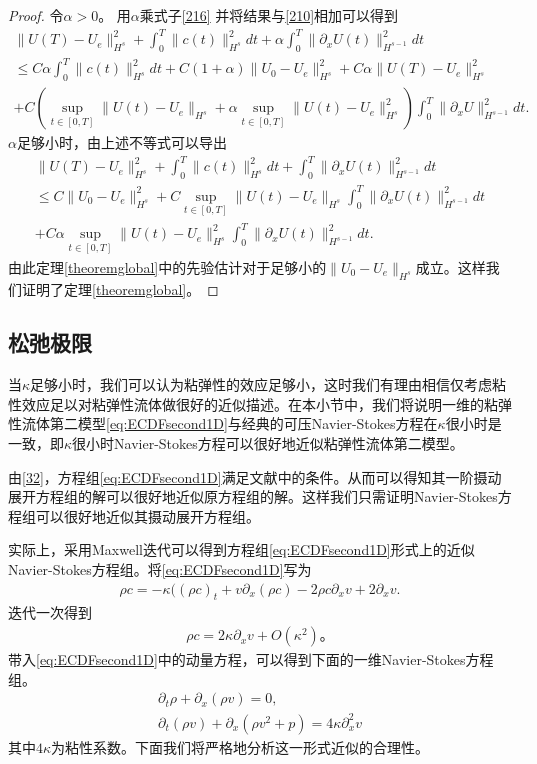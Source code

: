 \begin{proof}
令$\alpha>0$。 用$\alpha$乘式子\eqref{216} 并将结果与\eqref{210}相加可以得到
\begin{eqnarray*}
  \|U(T)-U_e\|_{H^s}^2 + \int_0^T \|c(t)\|_{H^s}^2 dt + \alpha \int_0^T \|\partial_x U(t)\|_{H^{s-1}}^2 dt \\
  \le C \alpha \int_0^T \|c(t)\|_{H^s}^2 dt +C(1+\alpha)\|U_0 -U_e\|_{H^s}^2 + C \alpha \|U(T)-U_e\|_{H^s}^2  \\ + C(\sup_{t \in [0,T]} \|U(t)-U_e\|_{H^s} + \alpha \sup_{t \in [0,T]} \|U(t)-U_e\|_{H^s}^2)  \int_0^T \|\partial_x U\|_{H^{s-1}}^2 dt.
\end{eqnarray*}
$\alpha$足够小时，由上述不等式可以导出
\begin{eqnarray*}
  \|U(T)-U_e\|_{H^s}^2 + \int_0^T \|c(t)\|_{H^s}^2 dt + \int_0^T \|\partial_x U(t)\|_{H^{s-1}}^2 dt \\
  \le C \|U_0-U_e\|_{H^s}^2 + C \sup_{t \in [0,T]} \|U(t)-U_e\|_{H^s} \int_0^T \|\partial_x U(t)\|_{H^{s-1}}^2 dt \\
  +C\alpha  \sup_{t \in [0,T]} \|U(t)-U_e\|_{H^s}^2 \int_0^T \|\partial_x U(t)\|_{H^{s-1}}^2 dt.
\end{eqnarray*}
由此定理\ref{theoremglobal}中的先验估计对于足够小的$\|U_0 -U_e\|_{H^s}$成立。这样我们证明了定理\ref{theoremglobal}。
\end{proof}

\subsection{松弛极限
}

当$\kappa$足够小时，我们可以认为粘弹性的效应足够小，这时我们有理由相信仅考虑粘性效应足以对粘弹性流体做很好的近似描述。在本小节中，我们将说明一维的粘弹性流体第二模型\eqref{eq:ECDFsecond1D}与经典的可压Navier-Stokes方程在$\kappa$很小时是一致，即$\kappa$很小时Navier-Stokes方程可以很好地近似粘弹性流体第二模型。

由\eqref{32}，方程组\eqref{eq:ECDFsecond1D}满足文献\cite{yong1999singular}中的条件。从而可以得知其一阶摄动展开方程组的解可以很好地近似原方程组的解。这样我们只需证明Navier-Stokes方程组可以很好地近似其摄动展开方程组。

实际上，采用Maxwell迭代可以得到方程组\eqref{eq:ECDFsecond1D}形式上的近似Navier-Stokes方程组。将\eqref{eq:ECDFsecond1D}写为
\begin{eqnarray*}
 \rho c= -\kappa(( \rho c)_t + v \partial_x (\rho c) - 2 \rho c \partial_x v + 2 \partial_x v.
\end{eqnarray*}
迭代一次得到
\begin{eqnarray*}
  \rho c = 2 \kappa \partial_x v + O(\kappa^2)。
\end{eqnarray*}
带入\eqref{eq:ECDFsecond1D}中的动量方程，可以得到下面的一维Navier-Stokes方程组。
\begin{align}\label{51}
  \partial_t \rho + \partial_x (\rho v ) = 0, \nonumber \\
  \partial_t (\rho v) + \partial_x( \rho v^2 + p) = 4 \kappa \partial^2_x v
\end{align}
其中$4\kappa$为粘性系数。下面我们将严格地分析这一形式近似的合理性。

